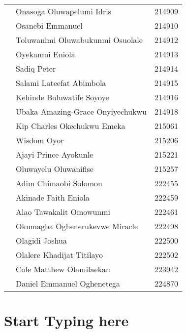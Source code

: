 \documentclass[a4paper]{article}
\newcounter{rowcount}
\newcommand\rownumber{\stepcounter{rowcount}\arabic{rowcount}}
\begin{document}
\begin{center}
\begin{longtable} { c|l|c }
            \rownumber\space & Onasoga Oluwapelumi Idris & 214909 \\
            \rownumber\space & Osanebi Emmanuel & 214910 \\
            \rownumber\space & Toluwanimi Oluwabukunmi Osuolale & 214912 \\
            \rownumber\space & Oyekanmi Eniola & 214913 \\
            \rownumber\space & Sadiq Peter & 214914 \\
            \rownumber\space & Salami Lateefat Abimbola & 214915 \\
            \rownumber\space & Kehinde Boluwatife Soyoye & 214916 \\
            \rownumber\space & Ubaka Amazing-Grace Onyiyechukwu & 214918 \\
            \rownumber\space & Kip Charles Okechukwu Emeka & 215061 \\
            \rownumber\space & Wisdom Oyor & 215206 \\
            \rownumber\space & Ajayi Prince Ayokunle & 215221 \\
            \rownumber\space & Oluwayelu Oluwanifise & 215257 \\
            \rownumber\space & Adim Chimaobi Solomon & 222455 \\
            \rownumber\space & Akinade Faith Eniola & 222459 \\
            \rownumber\space & Alao Tawakalit Omowunmi & 222461 \\
            \rownumber\space & Okumagba Oghenerukevwe Miracle & 222498 \\
            \rownumber\space & Olagidi Joshua & 222500 \\
            \rownumber\space & Olalere Khadijat Titilayo & 222502 \\
            \rownumber\space & Cole Matthew Olamilaekan & 223942 \\
            \rownumber\space & Daniel Emmanuel Oghenetega & 224870 \\
            \bottomrule[4pt]
        \end{longtable}
        \normalsize
    \end{center}

    \newpage
    \section{Start Typing here}
\end{document}
